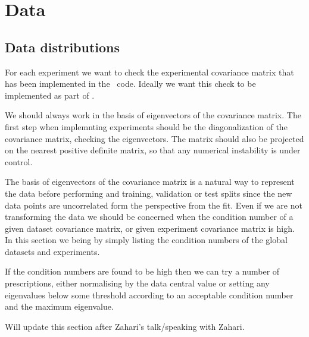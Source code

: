 \section{Data}
\label{sec:data}

\subsection{Data distributions}
\label{eq:data-distr}
For each experiment we want to check the experimental covariance matrix that has
been implemented in the \nnpdf\ code. Ideally we want this check to be
implemented as part of \valid.

We should always work in the basis of eigenvectors of the covariance matrix. The
first step when implemnting experiments should be the diagonalization of the
covariance matrix, checking the eigenvectors. The matrix should also be
projected on the nearest positive definite matrix, so that any numerical
instability is under control.

The basis of eigenvectors of the covariance matrix is a natural way to
represent the data before performing and training, validation or test splits
since the new data points are uncorrelated form the perspective from the fit.
Even if we are not transforming the data we should be concerned when the condition
number of a given dataset covariance matrix, or given experiment covariance matrix
is high. In this section we being by simply listing the condition numbers of
the global datasets and experiments.

If the condition numbers are found to be high then we can try a number of prescriptions, either
normalising by the data central value or setting any eigenvalues below some threshold according
to an acceptable condition number and the maximum eigenvalue.

Will update this section after Zahari's talk/speaking with Zahari.
